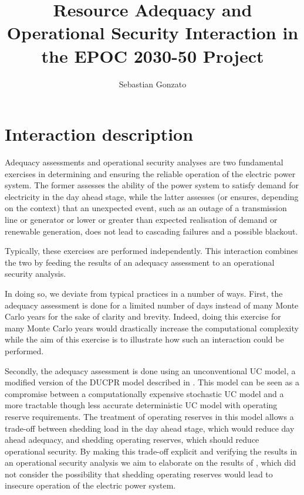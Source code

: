 \documentclass[number,times]{elsarticle}
\begin{document}
\title{Resource Adequacy and Operational Security Interaction in the EPOC 2030-50 Project}

\author{Sebastian Gonzato}

\maketitle

\newpage

\tableofcontents



\newpage

\section{Interaction description}

Adequacy assessments and operational security analyses are two fundamental exercises in determining and ensuring the reliable operation of the electric power system. The former assesses the ability of the power system to satisfy demand for electricity in the day ahead stage, while the latter assesses (or ensures, depending on the context) that an unexpected event, such as an outage of a transmission line or generator or lower or greater than expected realisation of demand or renewable generation, does not lead to cascading failures and a possible blackout.

Typically, these exercises are performed independently. This interaction combines the two by feeding the results of an adequacy assessment to an operational security analysis.

In doing so, we deviate from typical practices in a number of ways. First, the adequacy assessment is done for a limited number of days instead of many Monte Carlo years for the sake of clarity and brevity. Indeed, doing this exercise for many Monte Carlo years would drastically increase the computational complexity while the aim of this exercise is to illustrate how such an interaction could be performed.

Secondly, the adequacy assessment is done using an unconventional \ac{UC} model, a modified version of the \ac{DUCPR} model described in \cite{Bruninx2017}. This model can be seen as a compromise between a computationally expensive stochastic \ac{UC} model and a more tractable though less accurate deterministic \ac{UC} model with operating reserve requirements. The treatment of operating reserves in this model allows a trade-off between shedding load in the day ahead stage, which would reduce day ahead adequacy, and shedding operating reserves, which should reduce operational security. By making this trade-off explicit and verifying the results in an operational security analysis we aim to elaborate on the results of \cite{Hermans2018}, which did not consider the possibility that shedding operating reserves would lead to insecure operation of the electric power system.
\end{document}
